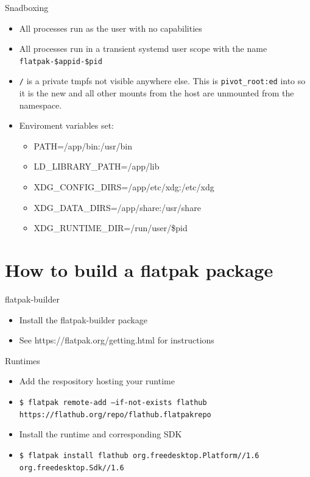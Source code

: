 \documentclass{lug}
\begin{document}
\begin{frame}{Snadboxing}
    \begin{itemize}
        \item All processes run as the user with no capabilities
        \item All processes run in a transient systemd user scope with the name \texttt{flatpak-\$appid-\$pid}
        \item \texttt{/} is a private tmpfs not visible anywhere else. This is \texttt{pivot\_root:ed} into so it is the new  and all other mounts from the host are unmounted from the namespace.
        \item Enviroment variables set:
        \begin{itemize}
            \item {PATH=/app/bin:/usr/bin}
            \item {LD\_LIBRARY\_PATH=/app/lib}
            \item {XDG\_CONFIG\_DIRS=/app/etc/xdg:/etc/xdg}
            \item {XDG\_DATA\_DIRS=/app/share:/usr/share}
            \item {XDG\_RUNTIME\_DIR=/run/user/\$pid}
        \end{itemize}    
    \end{itemize}
\end{frame}


\section{How to build a flatpak package}

\begin{frame}{flatpak-builder}
    \begin{itemize}
        \item Install the flatpak-builder package
        \item See https://flatpak.org/getting.html for instructions
    \end{itemize}
\end{frame}

\begin{frame}{Runtimes}
    \begin{itemize}
        \item Add the respository hosting your runtime 
        \item\texttt{\$\ flatpak remote-add --if-not-exists flathub https://flathub.org/repo/flathub.flatpakrepo}
        \item Install the runtime and corresponding SDK
        \item\texttt{\$\ flatpak install flathub org.freedesktop.Platform//1.6 org.freedesktop.Sdk//1.6}
    \end{itemize}
\end{frame}
\end{document}
